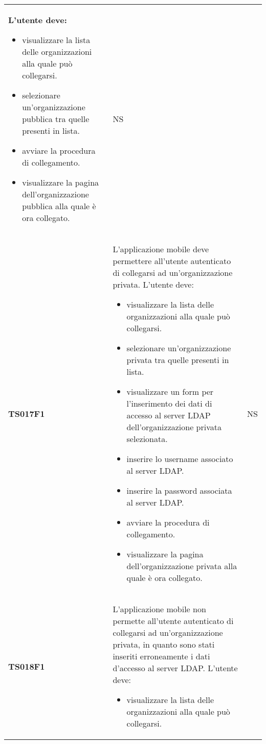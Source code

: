 \documentclass[../piano-di-qualifica.tex]{subfiles}
\begin{document}
\begin{centering}
\begin{longtable}[H]{>{\centering\bfseries}m{3cm} >{}p{10cm} >{\centering\arraybackslash}m{3cm}}
                      L'utente deve:
                      \begin{itemize}
                        \item visualizzare la lista delle organizzazioni alla quale può collegarsi.
                        \item selezionare un'organizzazione pubblica tra quelle presenti in lista.
                        \item avviare la procedura di collegamento.
                        \item visualizzare la pagina dell'organizzazione pubblica alla quale è ora collegato.
                      \end{itemize}
                    & NS \\
        TS017F1     & L'applicazione mobile deve permettere all'utente autenticato di collegarsi ad un'organizzazione privata. \newline
                      L'utente deve:
                      \begin{itemize}
                        \item visualizzare la lista delle organizzazioni alla quale può collegarsi.
                        \item selezionare un'organizzazione privata tra quelle presenti in lista.
                        \item visualizzare un form per l'inserimento dei dati di accesso al server LDAP dell'organizzazione privata selezionata.
                        \item inserire lo username associato al server LDAP\@.
                        \item inserire la password associata al server LDAP\@.
                        \item avviare la procedura di collegamento.
                        \item visualizzare la pagina dell'organizzazione privata alla quale è ora collegato.
                      \end{itemize}
                    & NS \\
        TS018F1     & L'applicazione mobile non permette all'utente autenticato di collegarsi ad un'organizzazione privata, in quanto sono stati inseriti erroneamente i dati d'accesso al server LDAP\@. \newline
                      L'utente deve:
                      \begin{itemize}
                        \item visualizzare la lista delle organizzazioni alla quale può collegarsi.

\end{itemize}
\end{longtable}
\end{centering}
\end{document}
